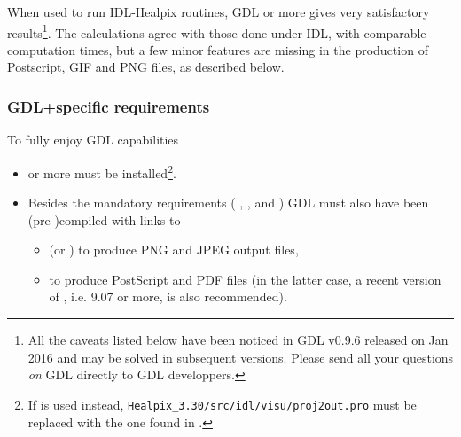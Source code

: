 \documentclass[12pt,twoside]{article}
\begin{document}
When used to run IDL-Healpix routines, GDL \gdlversion or more gives
very satisfactory results\footnote{All the caveats listed below have been noticed in
GDL v0.9.6 released on Jan 2016 and may be solved in subsequent versions. Please send all your questions
{\em on} GDL directly to GDL developpers.}. The calculations agree with those done under IDL, with
comparable computation times, but a few minor features are missing in the production
of Postscript, GIF and PNG files, as described below.

\subsubsection*{GDL+\healpix specific requirements}
To fully enjoy GDL capabilities
\begin{itemize}
\item \healpix \hpxversion{} or more must be installed\footnote{%
If  is used instead, {\tt Healpix\_3.30/src/idl/visu/proj2out.pro} must be replaced with the one found in 
.
}.

\item
Besides the mandatory requirements (%
, 
, 
and 
) 
GDL must also have been (pre-)compiled with links to
\begin{itemize}
\item {}
(or ) 
to produce PNG and JPEG output files, 
\item {} to produce PostScript and PDF files (in the latter case,
a recent version of , i.e. 9.07 or more, is also recommended).
\end{itemize}


\end{itemize}
\end{document}

